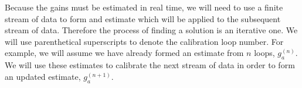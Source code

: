\documentclass[a4paper,fleqn,usenatbib]{../mnras}
\newcommand{\ra}{\ensuremath{\mathbf{r}_a}}
\newcommand{\beamr}{\ensuremath{\widetilde{W}}}
\newcommand{\Er}[1]{\ensuremath{\widetilde{E}_{#1}}}
\newcommand{\dif}{\mathrm{d}}
\begin{document}
Because the gains must be estimated in real time, we will need to use a finite stream of data to form and estimate which will be applied to the subsequent stream of data. Therefore the process of finding a solution is an iterative one. We will use parenthetical superscripts to denote the calibration loop number. For example, we will assume we have already formed an estimate from $n$ loops, $g^{(n)}_a$. We will use these estimates to calibrate the next stream of data in order to form an updated estimate, $g^{(n+1)}_a$.




%
%
\end{document}

